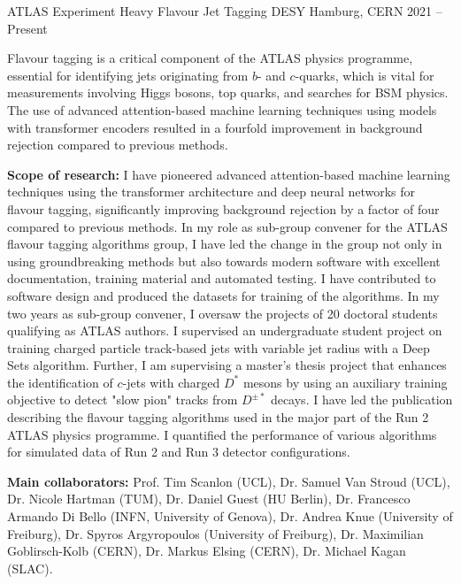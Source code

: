 \begin{cventries}
\cventry
  {ATLAS Experiment} %
  {Heavy Flavour Jet Tagging} %
  {DESY Hamburg, CERN} %
  {2021 -- Present} %
{
  \begin{cvitems} %
    \item {Flavour tagging is a critical component of the ATLAS physics programme, essential for identifying jets originating from \(b\)- and \(c\)-quarks, which is vital for measurements involving Higgs bosons, top quarks, and searches for BSM physics. The use of advanced attention-based machine learning
    techniques using models with transformer encoders resulted in a fourfold improvement in
    background rejection compared to previous methods.}
    \item \textbf{Scope of research:} I have pioneered advanced attention-based machine learning techniques
    using the transformer architecture and deep neural networks for flavour tagging, significantly
    improving background rejection by a factor of four compared to previous methods. In my role
    as sub-group convener for the ATLAS flavour tagging algorithms group, I have led the
    change in the group not only in using groundbreaking methods but also towards modern
    software with excellent documentation, training material and automated testing. I have
    contributed to software design and produced the datasets for training of the algorithms. In my
    two years as sub-group convener, I oversaw the projects of 20 doctoral students qualifying as
    ATLAS authors. I supervised an undergraduate student project on training charged particle
    track-based jets with variable jet radius with a Deep Sets algorithm. Further, I am supervising
    a master's thesis project that enhances the identification of \(c\)-jets with charged \(D^{\ast}\) mesons by
    using an auxiliary training objective to detect "slow pion" tracks from \(D^{\pm \ast}\) decays. I have led
    the publication describing the flavour tagging algorithms used in the major part of the Run 2
    ATLAS physics programme. I quantified the performance of various algorithms for simulated
    data of Run 2 and Run 3 detector configurations.
    \item \textbf{Main collaborators:} Prof. Tim Scanlon (UCL), Dr. Samuel Van Stroud (UCL), Dr. Nicole
    Hartman (TUM), Dr. Daniel Guest (HU Berlin), Dr. Francesco Armando Di Bello (INFN,
    University of Genova), Dr. Andrea Knue (University of Freiburg), Dr. Spyros Argyropoulos (University of Freiburg), Dr. Maximilian Goblirsch-Kolb (CERN), Dr. Markus Elsing (CERN),
    Dr. Michael Kagan (SLAC).
  \end{cvitems}
}


\end{cventries}
